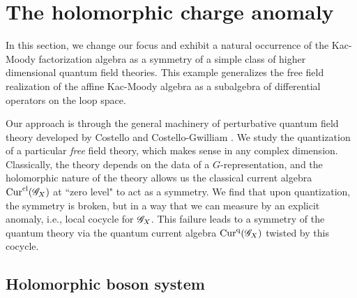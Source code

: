 \section{The holomorphic charge anomaly} \label{sec: qft}

In this section, we change our focus and exhibit a natural occurrence of the Kac-Moody factorization algebra as a symmetry of a simple class of higher dimensional quantum field theories. 
This example generalizes the free field realization of the affine Kac-Moody algebra as a subalgebra of differential operators on the loop space. 

Our approach is through the general machinery of perturbative quantum field theory developed by Costello \cite{CosRenorm} and Costello-Gwilliam \cite{CG1,CG2}.
We study the quantization of a particular {\em free} field theory, which makes sense in any complex dimension.
Classically, the theory depends on the data of a $G$-representation, and the holomorphic nature of the theory allows us the classical current algebra ${\rm Cur}^{{\rm cl}}(\mathscr G_X)$ at ``zero level" to act as a symmetry. 
We find that upon quantization, the symmetry is broken, but in a way that we can measure by an explicit anomaly, i.e., local cocycle for $\mathscr G_X$. 
This failure leads to a symmetry of the quantum theory via the quantum current algebra ${\rm Cur}^{{\rm q}}(\mathscr G_X)$ twisted by this cocycle.  
 
%
%
%

\subsection{Holomorphic boson system}

